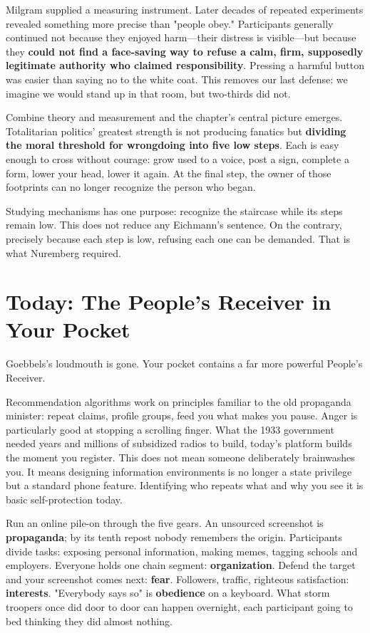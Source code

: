Milgram supplied a measuring instrument. Later decades of repeated experiments revealed something more precise than "people obey." Participants generally continued not because they enjoyed harm---their distress is visible---but because they \textbf{could not find a face-saving way to refuse a calm, firm, supposedly legitimate authority who claimed responsibility}. Pressing a harmful button was easier than saying no to the white coat. This removes our last defense: we imagine we would stand up in that room, but two-thirds did not.

Combine theory and measurement and the chapter's central picture emerges. Totalitarian politics' greatest strength is not producing fanatics but \textbf{dividing the moral threshold for wrongdoing into five low steps}. Each is easy enough to cross without courage: grow used to a voice, post a sign, complete a form, lower your head, lower it again. At the final step, the owner of those footprints can no longer recognize the person who began.

Studying mechanisms has one purpose: recognize the staircase while its steps remain low. This does not reduce any Eichmann's sentence. On the contrary, precisely because each step is low, refusing each one can be demanded. That is what Nuremberg required.

\section{Today: The People's Receiver in Your Pocket}
Goebbels's loudmouth is gone. Your pocket contains a far more powerful People's Receiver.

Recommendation algorithms work on principles familiar to the old propaganda minister: repeat claims, profile groups, feed you what makes you pause. Anger is particularly good at stopping a scrolling finger. What the 1933 government needed years and millions of subsidized radios to build, today's platform builds the moment you register. This does not mean someone deliberately brainwashes you. It means designing information environments is no longer a state privilege but a standard phone feature. Identifying who repeats what and why you see it is basic self-protection today.

Run an online pile-on through the five gears. An unsourced screenshot is \textbf{propaganda}; by its tenth repost nobody remembers the origin. Participants divide tasks: exposing personal information, making memes, tagging schools and employers. Everyone holds one chain segment: \textbf{organization}. Defend the target and your screenshot comes next: \textbf{fear}. Followers, traffic, righteous satisfaction: \textbf{interests}. "Everybody says so" is \textbf{obedience} on a keyboard. What storm troopers once did door to door can happen overnight, each participant going to bed thinking they did almost nothing.

